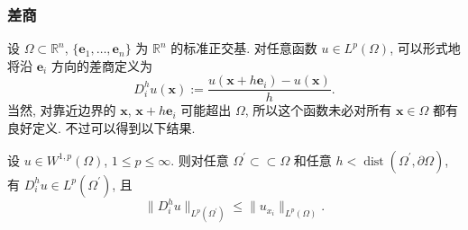 \subsubsection{差商}\label{subsec:elliptic-regularity-difference-quotients}

设 $\Omega\subset\mathbb{R}^n$, $\{\bm{e}_1,\ldots,\bm{e}_n\}$ 为 $\mathbb{R}^n$ 的标准正交基. 对任意函数 $u\in L^p(\Omega)$, 可以形式地将沿 $\bm{e}_i$ 方向的差商定义为
\begin{equation}\label{eq:coordinate-direction-difference-quotient-definition}
D_i^hu(\bm{x}):=\frac{u(\bm{x}+h\bm{e}_i)-u(\bm{x})}{h}.
\end{equation}
当然, 对靠近边界的 $\bm{x}$, $\bm{x}+h\bm{e}_i$ 可能超出 $\Omega$, 所以这个函数未必对所有 $\bm{x}\in\Omega$ 都有良好定义. 不过可以得到以下结果.

\begin{Lemma}
\label{lem:difference-quotient-weak-derivative-bound}
设 $u\in W^{1,p}(\Omega)$, $1\leq p\leq\infty$. 则对任意 $\Omega^{\prime}\subset\subset\Omega$ 和任意 $h<\operatorname{dist}(\Omega^{\prime},\partial\Omega)$, 有 $D_i^hu\in L^p(\Omega^{\prime})$, 且
\begin{equation}\label{eq:difference-quotient-bound-by-weak-derivative}
\|D_i^hu\|_{L^p(\Omega^{\prime})}\leq\|u_{x_i}\|_{L^p(\Omega)}.
\end{equation}

\end{Lemma}

